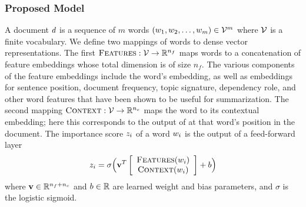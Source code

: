 \subsubsection{Proposed Model}


%
%
%
%
%

 A document $d$
is a sequence of $m$ words $(w_1, w_2, \ldots, w_m) \in \mathcal{V}^m$
where  $\mathcal{V}$ is a finite vocabulary.
We define two mappings of words to dense vector representations.
The first $\textsc{Features} : \mathcal{V} \rightarrow \mathbb{R}^{n_f}$ maps words to 
a concatenation of feature embeddings whose total dimension is of size $n_f$. 
The various components of the feature embeddings include the word's \glove{} 
embedding, as well as embeddings for sentence position, document frequency,
topic signature, dependency role, 
and other word features that have been shown to be useful for summarization.
The second mapping
$\textsc{Context} : \mathcal{V} \rightarrow \mathbb{R}^{n_c}$ maps the word to its contextual
embedding; here this corresponds to the output of \elmo{} 
\citep{peters2018deep} at that word's
position in the document. 
The importance score $z_i$ of a word $w_i$ is the output of 
a feed-forward layer 
\[ z_i = \sigma\Big(\mathbf{v}^T \left[\begin{array}{c} \textsc{Features}(w_i) \\ \textsc{Context}(w_i) \end{array} \right] + b \Big) \]
    where $\mathbf{v} \in \mathbb{R}^{n_f + n_c}$ and $b \in \mathbb{R}$ are learned weight
and bias parameters, and $\sigma$ is the logistic sigmoid. 

